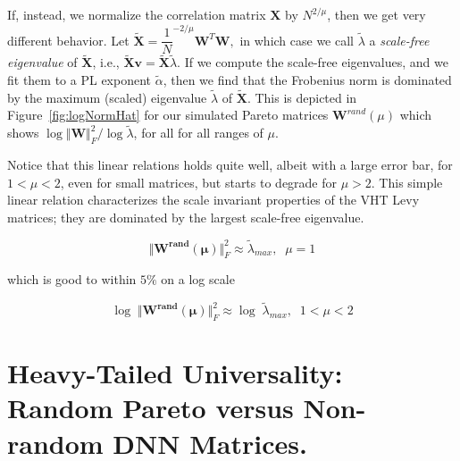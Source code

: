 If, instead, we normalize the correlation matrix $\mathbf{X}$ by $N^{2/\mu}$, then we get very different behavior.
Let 
$
\tilde{\mathbf{X}}=\dfrac{1}N^{-2/\mu}\mathbf{W}^{T}\mathbf{W}  ,
$
in which case we call $\tilde{\lambda}$ a \emph{scale-free eigenvalue} of $\tilde{\mathbf{X}}$, i.e.,
$  %
\tilde{\mathbf{X}}\mathbf{v}=\tilde{\mathbf{X}}\tilde{\lambda}  .
$  %
If we compute the scale-free eigenvalues, and we fit them to a PL exponent $\tilde{\alpha}$, then we find that the Frobenius norm is dominated by the maximum (scaled) eigenvalue $\tilde{\lambda}$ of $\tilde{\mathbf{X}}$.  
This is depicted in 
Figure~\ref{fig:logNormHat}
for our simulated Pareto matrices $\mathbf{W}^{rand}(\mu)$ which shows
$\log\Vert\mathbf{W}\Vert^{2}_{F}/\log\tilde{\lambda}$,
for all for all ranges of $\mu$.



Notice that this linear relations holds quite well, albeit with a large error bar, for $1<\mu<2$, even for small matrices, but starts to degrade for $\mu>2$.
This simple linear relation characterizes the scale invariant properties of the VHT Levy matrices; they are dominated by the largest scale-free eigenvalue.

$$\Vert\mathbf{W^{rand}(\mu)}\Vert^{2}_{F}\approx\tilde{\lambda}_{max},\;\;\mu=1$$


which is good to within $5\%$ on a log scale

$$\log\;\Vert\mathbf{W^{rand}(\mu)}\Vert^{2}_{F}\approx\log\;\tilde{\lambda}_{max},\;\;1<\mu<2$$


\section{Heavy-Tailed Universality: Random Pareto versus Non-random DNN Matrices.} 
\label{sxn:appendix-universality}


